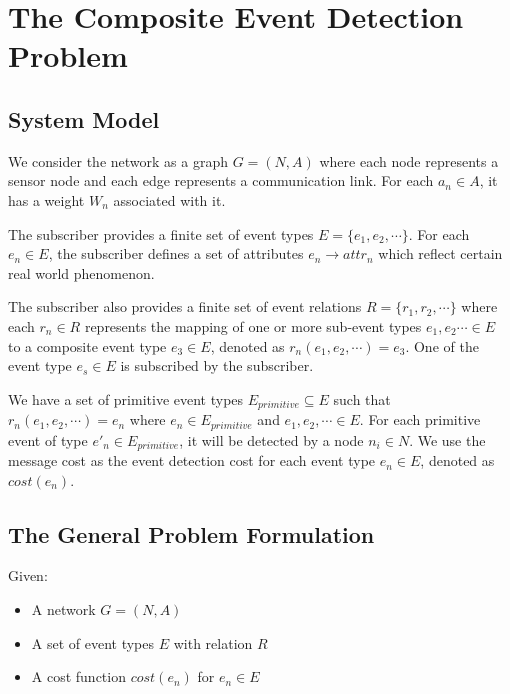 \section{The Composite Event Detection Problem}
\label{sec:system_model}
\begin{comment}
In this section, we formally define the problem of composite event detection.
\end{comment}
\subsection{System Model}
We consider the network as a graph \(G=(N, A)\) where each node represents a sensor node and each edge represents a communication link. For each \(a_n\in A\), it has a weight \(W_n\) associated with it.

The subscriber provides a finite set of event types \(E=\{e_1,e_2,\cdots\}\). For each \(e_n\in E\), the subscriber defines a set of attributes \(e_n\rightarrow attr_n\) which reflect certain real world phenomenon. 

The subscriber also provides a finite set of event relations \(R=\{r_1,r_2, \cdots\}\) where each \(r_n\in R\) represents the mapping of one or more sub-event types \(e_1, e_2\cdots \in E\) to a composite event type \(e_3\in E\), denoted as \(r_n(e_1, e_2, \cdots)=e_3\). One of the event type \(e_s\in E\) is subscribed by the subscriber. %

\begin{comment}
\begin{figure}
\centering
\figurecurrentwidth{eventdag}
\caption{Event DAG}
\label{fig:eventdag}
\end{figure}
\end{comment}

We have a set of primitive event types \(E_{primitive}\subseteq E\) such that \(r_n(e_1, e_2, \cdots)=e_n\) where \(e_n\in E_{primitive}\) and \(e_1, e_2, \cdots \in E\). For each primitive event of type \(e'_n\in E_{primitive}\), it will be detected by a node \(n_i\in N\). We use the message cost as the event detection cost for each event type \(e_n\in E\), denoted as \(cost(e_n)\).

\subsection{The General Problem Formulation}
Given:
\begin{itemize}
	\item A network \(G=(N, A)\)
	\item A set of event types \(E\) with relation \(R\)
	\item A cost function \(cost(e_n)\) for \(e_n\in E\)
\end{itemize}

